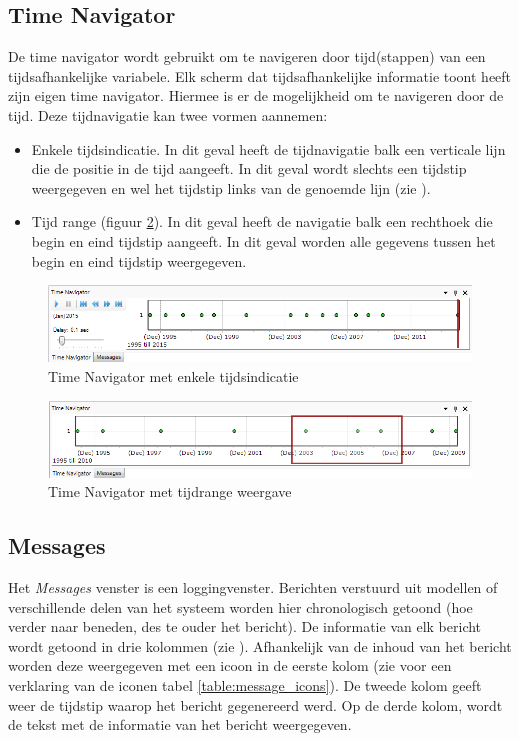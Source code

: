\subsection{Time Navigator}
	\label{sec:TimeSeriesNavigator}
De time navigator wordt gebruikt om te navigeren door tijd(stappen) van een tijdsafhankelijke variabele. Elk scherm dat tijdsafhankelijke informatie toont heeft zijn eigen time navigator. Hiermee is er de mogelijkheid om te navigeren door de tijd. Deze tijdnavigatie kan twee vormen aannemen:
\begin{itemize}
\item Enkele tijdsindicatie. In dit geval heeft de tijdnavigatie balk een verticale lijn die de positie in de tijd aangeeft. In dit geval wordt slechts een tijdstip weergegeven en wel het tijdstip links van de genoemde lijn (zie ). 
\item Tijd range (figuur \ref{fig:TimeSeriesNavigator_Range}). In dit geval heeft de navigatie balk een rechthoek die begin en eind tijdstip aangeeft. In dit geval worden alle gegevens tussen het begin en eind tijdstip weergegeven.
\end{itemize}

\begin{figure}[H]
	\centering
		\includegraphics[width=\textwidth]{figures/chapter_general/TimeSeriesNavigator.png}
		\caption{Time Navigator met enkele tijdsindicatie}
	\label{fig:TimeSeriesNavigator}
\end{figure}

\begin{figure}[H]
	\centering
		\includegraphics[width=\textwidth]{figures/chapter_general/TimeSeriesNavigator_Range.png}
		\caption{Time Navigator met tijdrange weergave}
	\label{fig:TimeSeriesNavigator_Range}
\end{figure}

\subsection{Messages}
	\label{sec:RT_Messages}
Het \textit{Messages } venster is een loggingvenster. Berichten verstuurd uit modellen of verschillende delen van het systeem worden hier chronologisch getoond (hoe verder naar beneden, des te ouder het bericht). De informatie van elk bericht wordt getoond in drie kolommen (zie ). Afhankelijk van de inhoud van het bericht worden deze weergegeven met een icoon in de eerste kolom (zie voor een verklaring van de iconen tabel \ref{table:message_icons}). De tweede kolom geeft weer de tijdstip waarop het bericht gegenereerd werd. Op de derde kolom, wordt de tekst met de informatie van het bericht weergegeven.

